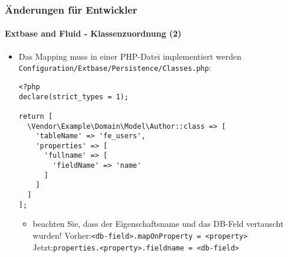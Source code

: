 
\begin{frame}[fragile]
	\frametitle{Änderungen für Entwickler}
	\framesubtitle{Extbase and Fluid - Klassenzuordnung (2)}

	\lstset{basicstyle=\tiny\ttfamily}

	\begin{itemize}
		\item Das Mapping muss in einer PHP-Datei implementiert werden \texttt{Configuration/Extbase/Persistence/Classes.php}:

\begin{lstlisting}
<?php
declare(strict_types = 1);

return [
  \Vendor\Example\Domain\Model\Author::class => [
    'tableName' => 'fe_users',
    'properties' => [
      'fullname' => [
        'fieldName' => 'name'
      ]
    ]
  ]
];
\end{lstlisting}

		\begin{itemize}\smaller
			\item[\ding{228}] beachten Sie, dass der Eigenschaftsname und das DB-Feld vertauscht wurden!\newline
				Vorher:\tabto{1.6cm}\texttt{<db-field>.mapOnProperty = <property>}\newline
				Jetzt:\tabto{1.6cm}\texttt{properties.<property>.fieldname = <db-field>}
		\end{itemize}\normalsize

	\end{itemize}

\end{frame}


